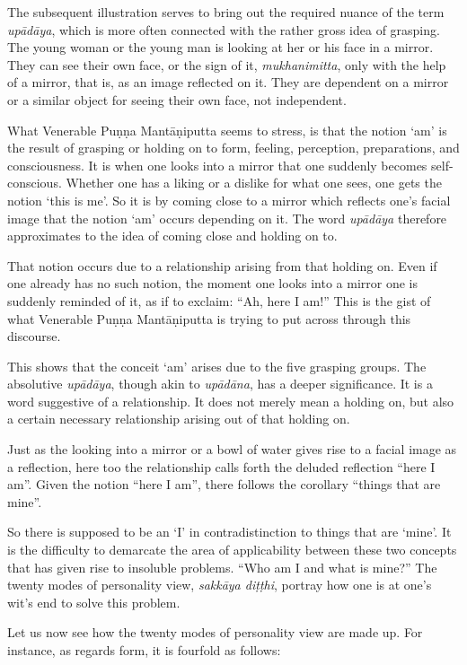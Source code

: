 The subsequent illustration serves to bring out the required nuance of the term \emph{upādāya}, which is more often connected with the rather gross idea of grasping. The young woman or the young man is looking at her or his face in a mirror. They can see their own face, or the sign of it, \emph{mukhanimitta}, only with the help of a mirror, that is, as an image reflected on it. They are dependent on a mirror or a similar object for seeing their own face, not independent.

What Venerable Puṇṇa Mantāṇiputta seems to stress, is that the notion `am' is the result of grasping or holding on to form, feeling, perception, preparations, and consciousness. It is when one looks into a mirror that one suddenly becomes self-conscious. Whether one has a liking or a dislike for what one sees, one gets the notion `this is me'. So it is by coming close to a mirror which reflects one's facial image that the notion `am' occurs depending on it. The word \emph{upādāya} therefore approximates to the idea of coming close and holding on to.

That notion occurs due to a relationship arising from that holding on. Even if one already has no such notion, the moment one looks into a mirror one is suddenly reminded of it, as if to exclaim: ``Ah, here I am!'' This is the gist of what Venerable Puṇṇa Mantāṇiputta is trying to put across through this discourse.

This shows that the conceit `am' arises due to the five grasping groups. The absolutive \emph{upādāya}, though akin to \emph{upādāna}, has a deeper significance. It is a word suggestive of a relationship. It does not merely mean a holding on, but also a certain necessary relationship arising out of that holding on.

Just as the looking into a mirror or a bowl of water gives rise to a facial image as a reflection, here too the relationship calls forth the deluded reflection ``here I am''. Given the notion ``here I am'', there follows the corollary ``things that are mine''.

So there is supposed to be an `I' in contradistinction to things that are `mine'. It is the difficulty to demarcate the area of applicability between these two concepts that has given rise to insoluble problems. ``Who am I and what is mine?'' The twenty modes of personality view, \emph{sakkāya diṭṭhi}, portray how one is at one's wit's end to solve this problem.

Let us now see how the twenty modes of personality view are made up. For instance, as regards form, it is fourfold as follows:

